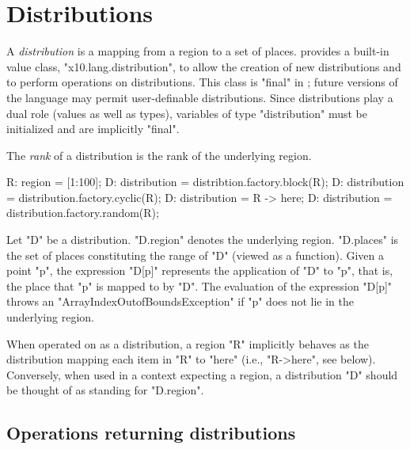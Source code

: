 \section{Distributions}\label{XtenDistributions}

A {\em distribution} is a mapping from a region to a set of places.
{}\Xten{} provides a built-in value class, \xcd"x10.lang.distribution", to allow the creation of new distributions and
to perform operations on distributions. This class is \xcd"final" in
{}\XtenCurrVer; future versions of the language may permit
user-definable distributions. Since distributions play a dual role
(values as well as types), variables of type \xcd"distribution" must
be initialized and are implicitly \xcd"final".

The {\em rank} of a distribution is the rank of the underlying region.



\begin{xten}
R: region = [1:100];
D: distribution = distribtion.factory.block(R);
D: distribution = distribution.factory.cyclic(R);
D: distribution = R -> here;
D: distribution = distribution.factory.random(R);
\end{xten}

Let \xcd"D" be a distribution. \xcd"D.region" denotes the underlying
region. \xcd"D.places" is the set of places constituting the range of
\xcd"D" (viewed as a function). Given a point \xcd"p", the expression
\xcd"D[p]" represents the application of \xcd"D" to \xcd"p", that is,
the place that \xcd"p" is mapped to by \xcd"D". The evaluation of the
expression \xcd"D[p]" throws an \xcd"ArrayIndexOutofBoundsException"
if \xcd"p" does not lie in the underlying region.

When operated on as a distribution, a region \xcd"R" implicitly
behaves as the distribution mapping each item in \xcd"R" to \xcd"here"
(i.e., \xcd"R->here", see below). Conversely, when used in a context
expecting a region, a distribution \xcd"D" should be thought of as
standing for \xcd"D.region".

{}

\subsection{Operations returning distributions}

